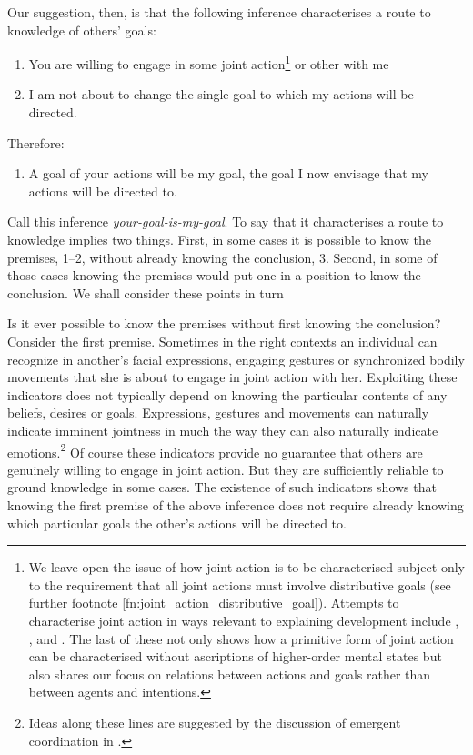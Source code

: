 \documentclass[12pt,a4paper]{extarticle}
\begin{document}
Our suggestion, then, is that the following inference characterises a route to knowledge of others’ goals:
%
\begin{enumerate}
\item You are willing to engage in some joint action\footnote{
We leave open the issue of how joint action is to be characterised subject only to the 
requirement that all joint actions must involve distributive goals (see further footnote \vref{fn:joint_action_distributive_goal}).
Attempts to characterise joint action in ways relevant to explaining development include
	\citet{Tollefsen:2005vh},
	\citet{Carpenter:2009wq},
	\citet{pacherie_framing_2011} and
	\citet{Butterfill:2011fk}.
The last of these 
not only shows how a primitive form of joint action can be characterised without ascriptions of higher-order mental states
but also shares our focus on relations between actions and goals rather than between agents and intentions.
}
or other with me

\item I am not about to change the single goal to which my actions will be directed.

\end{enumerate}
%
Therefore:
%
\begin{enumerate}[resume]
%
\item A goal of your actions will be my goal, the goal I now envisage that my actions will be directed to.
\end{enumerate}
%
Call this inference \emph{your-goal-is-my-goal}.  
To say that it characterises a route to knowledge implies two things.  
First, in some cases it is possible to know the premises, 1–2, without already knowing the conclusion, 3.  
Second, in some of those cases knowing the premises would put one in a position to know the conclusion.  
We shall consider these points in turn


Is it ever possible to know the premises without first knowing the conclusion?  
Consider the first premise.  
Sometimes 
in the right contexts
an individual can recognize in another's facial expressions, engaging gestures or synchronized bodily movements that she is about to engage in joint action with her.
Exploiting these indicators does not typically depend on knowing the particular contents of any beliefs, desires or goals.  
Expressions, gestures and movements can naturally indicate imminent jointness in much the way they can also naturally indicate emotions.\footnote{
Ideas along these lines are suggested by the discussion of {emergent coordination} in \citet{Knoblich:2010fk}.
}  
Of course these indicators provide no guarantee that others are genuinely willing to engage in joint action.  
But they are sufficiently reliable to ground knowledge in some cases.  
The existence of such indicators shows that knowing the first  premise of the above inference does not require already knowing which particular goals the other's actions will be directed to.  
\end{document}
